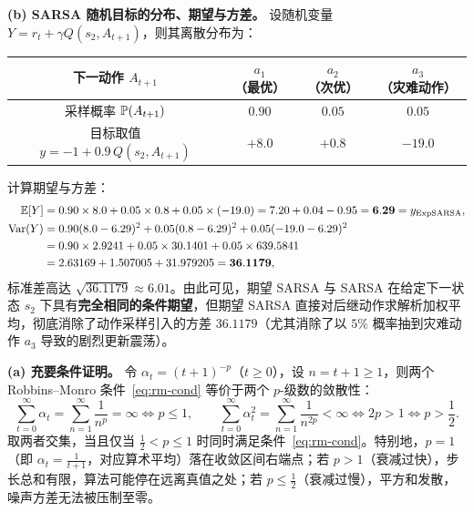 \textbf{(b) SARSA 随机目标的分布、期望与方差。} 设随机变量 $Y = r_t + \gamma Q(s_2, A_{t+1})$，则其离散分布为：
\begin{center}
\footnotesize
\begin{tabular}{cccc}
\toprule
下一动作 $A_{t+1}$ & $a_1$（最优） & $a_2$（次优） & $a_3$（灾难动作） \\
\midrule
采样概率 $\mathbb{P}(A_{t+1})$ & $0.90$ & $0.05$ & $0.05$ \\
目标取值 $y = -1 + 0.9\,Q(s_2, A_{t+1})$ & $+8.0$ & $+0.8$ & $-19.0$ \\
\bottomrule
\end{tabular}
\end{center}
计算期望与方差：
\begin{align*}
  \mathbb{E}[Y] &= 0.90 \times 8.0 + 0.05 \times 0.8 + 0.05 \times (-19.0) = 7.20 + 0.04 - 0.95 = \mathbf{6.29} = y_{\mathrm{ExpSARSA}}, \\
  \operatorname{Var}(Y) &= 0.90(8.0 - 6.29)^2 + 0.05(0.8 - 6.29)^2 + 0.05(-19.0 - 6.29)^2 \\
          &= 0.90 \times 2.9241 + 0.05 \times 30.1401 + 0.05 \times 639.5841 \\
          &= 2.63169 + 1.507005 + 31.979205 = \mathbf{36.1179},
\end{align*}
标准差高达 $\sqrt{36.1179} \approx 6.01$。由此可见，期望 SARSA 与 SARSA 在给定下一状态 $s_2$ 下具有\textbf{完全相同的条件期望}，但期望 SARSA 直接对后继动作求解析加权平均，彻底消除了动作采样引入的方差 $36.1179$（尤其消除了以 $5\%$ 概率抽到灾难动作 $a_3$ 导致的剧烈更新震荡）。


\textbf{(a) 充要条件证明。} 令 $\alpha_t = (t+1)^{-p}$（$t \ge 0$），设 $n = t + 1 \ge 1$，则两个 Robbins--Monro 条件~\eqref{eq:rm-cond} 等价于两个 $p$-级数的敛散性：
\[
  \sum_{t=0}^{\infty} \alpha_t = \sum_{n=1}^{\infty} \frac{1}{n^p} = \infty \iff p \le 1, \qquad
  \sum_{t=0}^{\infty} \alpha_t^2 = \sum_{n=1}^{\infty} \frac{1}{n^{2p}} < \infty \iff 2p > 1 \iff p > \frac{1}{2}.
\]
取两者交集，当且仅当 $\frac{1}{2} < p \le 1$ 时同时满足条件~\eqref{eq:rm-cond}。特别地，$p = 1$（即 $\alpha_t = \frac{1}{t+1}$，对应算术平均）落在收敛区间右端点；若 $p > 1$（衰减过快），步长总和有限，算法可能停在远离真值之处；若 $p \le \frac{1}{2}$（衰减过慢），平方和发散，噪声方差无法被压制至零。

